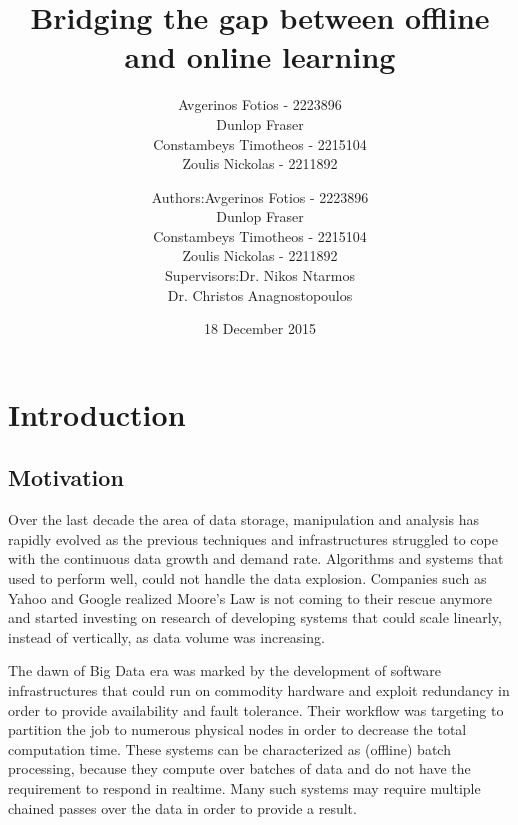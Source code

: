 \documentclass{lmproj}
\begin{document}
\title{Bridging the gap between offline and online learning}
\author{Avgerinos Fotios - 2223896\\
        Dunlop Fraser \\
        Constambeys Timotheos - 2215104\\
        Zoulis Nickolas - 2211892}
    
\author{\begin{tabular}{r@{ }l} 
		Authors:      & Avgerinos Fotios - 2223896\\
		& Dunlop Fraser \\
		& Constambeys Timotheos - 2215104\\
		& Zoulis Nickolas - 2211892\\[1ex] 
		Supervisors: & Dr. Nikos Ntarmos\\
		& Dr. Christos Anagnostopoulos
	\end{tabular}}    
    
\date{18 December 2015}
\maketitle

\tableofcontents
\chapter{Introduction}
\label{intro}

\section{Motivation}
\label{intro}

Over the last decade the area of data storage, manipulation and analysis has rapidly evolved as the previous techniques and infrastructures struggled to cope with the continuous data growth and demand rate. Algorithms and systems that used to perform well, could not handle the data explosion. Companies such as Yahoo and Google realized Moore's Law is not coming to their rescue anymore and started investing on research of developing systems that could scale linearly, instead of vertically, as data volume was increasing. 

The dawn of Big Data era was marked by the development of software infrastructures that could run on commodity hardware and exploit redundancy in order to provide availability and fault tolerance. Their workflow was targeting to partition the job to numerous physical nodes in order to decrease the total computation time. These systems can be characterized as (offline) batch processing, because they compute over batches of data and do not have the requirement to respond in realtime. Many such systems may require multiple chained passes over the data in order to provide a result.
\end{document}
